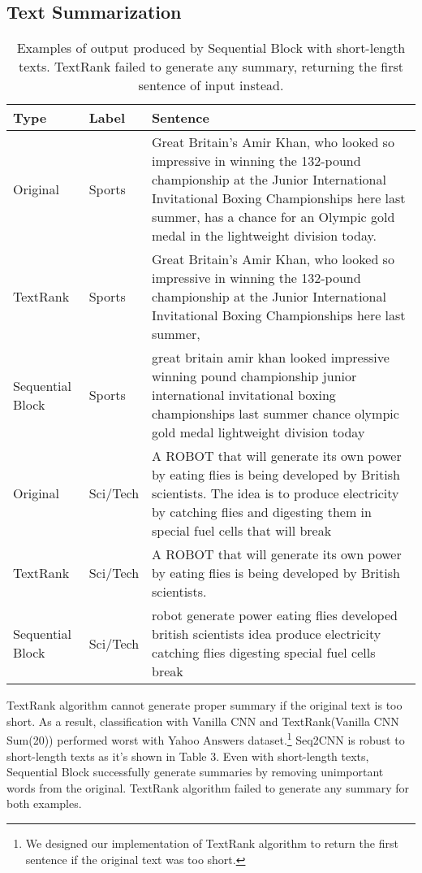 \documentclass{article}
\begin{document}
\subsection{Text Summarization}
\begin{table}
  \caption{Examples of output produced by Sequential Block with short-length texts. TextRank failed to generate any summary, returning the first sentence of input instead.}
  \label{table2}
  \centering
  \setlength{\extrarowheight}{2pt}
  \begin{tabular}{l|l|p{8cm}}
    \toprule
    Type & Label & Sentence \\
    \midrule
    Original & Sports & \parbox{8cm}{Great Britain's Amir Khan, who looked so impressive in winning the 132-pound championship at the Junior International Invitational Boxing Championships here last summer, has a chance for an Olympic gold medal in the lightweight division today.} \\
    \hline
    TextRank  & Sports &\parbox{8cm}{Great Britain's Amir Khan, who looked so impressive in winning the 132-pound championship at the Junior International Invitational Boxing Championships here last summer,}\\
    \hline
    Sequential Block  &Sports & \parbox{8cm}{great britain amir khan looked impressive winning pound championship junior international invitational boxing championships last summer chance olympic gold medal lightweight division today} \\
    \hline
    \hline
    Original & Sci/Tech & \parbox{8cm}{A ROBOT that will generate its own power by eating flies is being developed by British scientists. The idea is to produce electricity by catching flies and digesting them in special fuel cells that will break} \\
    \hline
    TextRank  & Sci/Tech &\parbox{8cm}{A ROBOT that will generate its own power by eating flies is being developed by British scientists.}\\
    \hline
    Sequential Block  &Sci/Tech & \parbox{8cm}{robot generate power eating flies developed british scientists idea produce electricity catching flies digesting special fuel cells break} \\
    \bottomrule
  \end{tabular}
\end{table}
TextRank\cite{mihalcea-tarau:2004:EMNLP} algorithm cannot generate proper summary if the original text is too short. As a result, classification with Vanilla CNN and TextRank(Vanilla CNN Sum(20)) performed worst with Yahoo Answers dataset.\footnote{We designed our implementation of TextRank algorithm to return the first sentence if the original text was too short.} Seq2CNN is robust to short-length texts as it's shown in Table 3. Even with short-length texts, Sequential Block successfully generate summaries by removing unimportant words from the original. TextRank\cite{mihalcea-tarau:2004:EMNLP} algorithm failed to generate any summary for both examples. 
\end{document}
